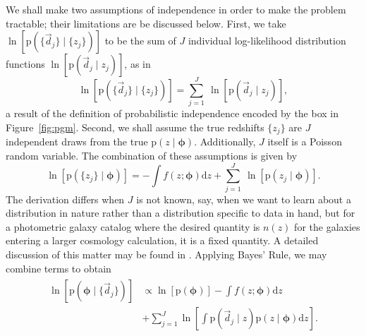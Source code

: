 \documentclass[iop]{emulateapj}
\newcommand{\Sect}[1]{Section~\ref{#1}}
\newcommand{\Eq}[1]{Equation~\ref{#1}}
\newcommand{\Fig}[1]{Figure~\ref{#1}}
\newcommand{\data}{\ensuremath{\vec{d}}}
\newcommand{\pr}[1]{\ensuremath{\mathrm{p}(#1)}}
\newcommand{\gvn}{\mid}%
\newcommand{\integral}[2]{\ensuremath{\int #1 \mathrm{d} #2}}
\newcommand{\bvec}[1]{\ensuremath{\boldsymbol{#1}}}
\newcommand{\ndphi}{\bvec{\phi}}
\begin{document}
We shall make two assumptions of independence in order to make the problem tractable; their limitations are be discussed below.  
First, we take $\ln[\pr{\{\data_{j}\} \gvn \{z_{j}\}}]$ to be the sum of $J$ individual log-likelihood distribution functions $\ln[\pr{\data_{j} \gvn z_{j}}]$, as in 
\begin{equation}
\label{eqn:indiedat}
\ln[\pr{\{\data_{j}\} \gvn \{z_{j}\}}] = \sum_{j=1}^{J}\ \ln[\pr{\data_{j} \gvn z_{j}}],
\end{equation}
a result of the definition of probabilistic independence encoded by the box in \Fig{fig:pgm}.
Second, we shall assume the true redshifts $\{z_{j}\}$ are $J$ independent draws from the true $\pr{z \gvn \ndphi}$.  
Additionally, $J$ itself is a Poisson random variable.  
The combination of these assumptions is given by 
\begin{equation}
\label{eqn:indie}
\ln[\pr{\{z_{j}\} \gvn \ndphi}] = -\integral{f(z; \ndphi)}{z} + \sum_{j=1}^{J}\ \ln[\pr{z_{j} \gvn \ndphi}].
\end{equation}
The derivation differs when $J$ is not known, say, when we want to learn about a distribution in nature rather than a distribution specific to data in hand, but for a photometric galaxy catalog where the desired quantity is $n(z)$ for the galaxies entering a larger cosmology calculation, it is a fixed quantity.
A detailed discussion of this matter may be found in \citet{foreman-mackey_exoplanet_2014}.  
Applying Bayes' Rule, we may combine terms to obtain 
\begin{align}
\begin{split}
\label{eqn:posterior}
\ln[\pr{\ndphi \gvn \{\data_{j}\}}] & \propto \ln[\pr{\ndphi}] - \integral{f(z; \ndphi)}{z}\\
& + \sum_{j=1}^{J}\ln\left[\integral{\pr{\data_{j} \gvn z} \pr{z \gvn \ndphi}}{z}\right].
\end{split}
\end{align}

\end{document}
